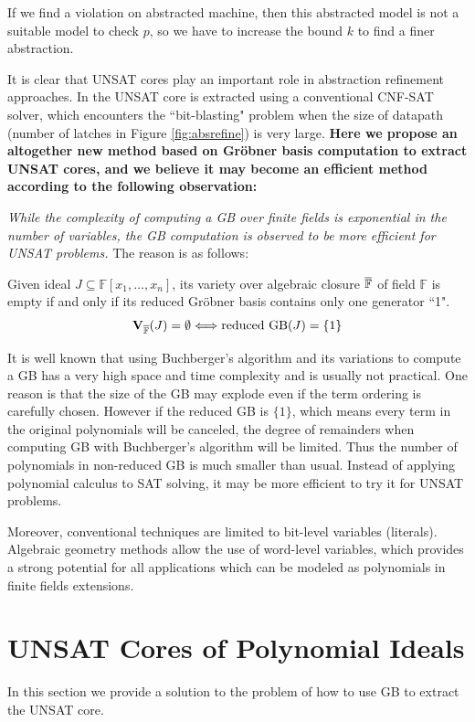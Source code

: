 If we find a violation on abstracted machine, then this
abstracted model is not a suitable model to check $p$, so we have to increase the bound $k$ to find a finer abstraction.

It is clear that UNSAT cores play an important role in abstraction refinement approaches. In \cite{zhang2005design}
the UNSAT core is extracted using a conventional CNF-SAT solver, which encounters the ``bit-blasting" problem
when the size of datapath (number of latches in Figure \ref{fig:absrefine}) is very large. \textbf{Here we propose an altogether new 
method based on Gr\"obner basis computation to extract UNSAT cores, and we believe it may become an efficient 
method according to the following observation:}

{\it While the complexity of computing a GB over finite fields is exponential in the number of variables,
the GB  computation is observed to be more efficient for UNSAT problems.} 
The reason is as follows:
\begin{Theorem}
Given ideal $J\subseteq \mathbb F[x_1,\dots,x_n]$, its variety over algebraic closure $\overline{{\mathbb{F}}}$
of field $\mathbb F$ is empty if and only if its reduced Gr\"obner basis contains only one generator ``1".
$${\bf V}_{\overline{\mathbb F}}(J) = \emptyset \Longleftrightarrow \text{reduced GB}(J) = \{1\}$$
\end{Theorem}
It is well known that using Buchberger's algorithm and its variations to compute a GB has a very high space and
time complexity and is usually not practical. One reason is that the size of the GB may explode even if the term
ordering is carefully chosen. However if the reduced GB is $\{1\}$, which means every term in the original polynomials
will be canceled, the degree of remainders when computing GB with Buchberger's algorithm will be limited. 
Thus the number of polynomials in non-reduced GB is much smaller than usual.
Instead of applying polynomial calculus to SAT solving, it may be more efficient to try it for UNSAT
problems.

Moreover, conventional techniques are limited to bit-level variables (literals). Algebraic geometry methods
allow the use of word-level variables, which provides a strong potential for all applications which can be
modeled as polynomials in finite fields extensions.

\section{UNSAT Cores of Polynomial Ideals}
\label{sec:core}
In this section we provide a solution to the problem of how to use 
GB to extract the UNSAT core. 

